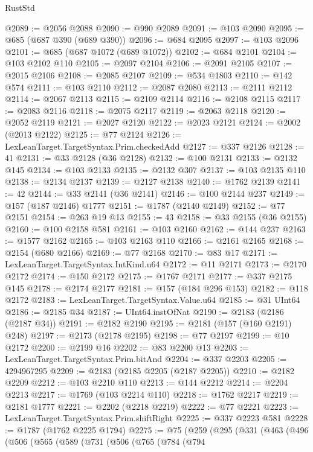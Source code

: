 \begin{lexlean}{RustStd}
\begin{coremodule}
@2089 := @2056 @2088
@2090 := @990 @2089
@2091 := @103 @2090
@2095 := @685 (@687 @390 (@689 @390))
@2096 := @684 @2095
@2097 := @103 @2096
@2101 := @685 (@687 @1072 (@689 @1072))
@2102 := @684 @2101
@2104 := @103 @2102 @110
@2105 := @2097 @2104
@2106 := @2091 @2105
@2107 := @2015 @2106
@2108 := @2085 @2107
@2109 := @534 @1803
@2110 := @142 @574
@2111 := @103 @2110
@2112 := @2087 @2080
@2113 := @2111 @2112
@2114 := @2067 @2113
@2115 := @2109 @2114
@2116 := @2108 @2115
@2117 := @2083 @2116
@2118 := @2075 @2117
@2119 := @2063 @2118
@2120 := @2052 @2119
@2121 := @2027 @2120
@2122 := @2023 @2121
@2124 := @2002 (@2013 @2122)
@2125 := @77 @2124
@2126 := LexLeanTarget.TargetSyntax.Prim.checkedAdd
@2127 := @337 @2126
@2128 := 41
@2131 := @33 @2128 (@36 @2128)
@2132 := @100 @2131
@2133 := @2132 @145
@2134 := @103 @2133
@2135 := @2132 @307
@2137 := @103 @2135 @110
@2138 := @2134 @2137
@2139 := @2127 @2138
@2140 := @1762 @2139
@2141 := 42
@2144 := @33 @2141 (@36 @2141)
@2146 := @100 @2144 @237
@2149 := @157 (@187 @2146) @1777
@2151 := @1787 (@2140 @2149)
@2152 := @77 @2151
@2154 := @263 @19 @13
@2155 := 43
@2158 := @33 @2155 (@36 @2155)
@2160 := @100 @2158 @581
@2161 := @103 @2160
@2162 := @144 @237
@2163 := @1577 @2162
@2165 := @103 @2163 @110
@2166 := @2161 @2165
@2168 := @2154 (@680 @2166)
@2169 := @77 @2168
@2170 := @83 @17
@2171 := LexLeanTarget.TargetSyntax.IntKind.u64
@2172 := @11 @2171
@2173 := @2170 @2172
@2174 := @150 @2172
@2175 := @1767 @2171
@2177 := @337 @2175 @145
@2178 := @2174 @2177
@2181 := @157 (@184 @296 @153)
@2182 := @118 @2172
@2183 := LexLeanTarget.TargetSyntax.Value.u64
@2185 := @31 UInt64
@2186 := @2185 @34
@2187 := UInt64.instOfNat
@2190 := @2183 (@2186 (@2187 @34))
@2191 := @2182 @2190
@2195 := @2181 (@157 (@160 @2191) @248)
@2197 := @2173 (@2178 @2195)
@2198 := @77 @2197
@2199 := @10 @2172
@2200 := @2199 @16
@2202 := @83 @2200 @13
@2203 := LexLeanTarget.TargetSyntax.Prim.bitAnd
@2204 := @337 @2203
@2205 := 4294967295
@2209 := @2183 (@2185 @2205 (@2187 @2205))
@2210 := @2182 @2209
@2212 := @103 @2210 @110
@2213 := @144 @2212
@2214 := @2204 @2213
@2217 := @1769 (@103 @2214 @110)
@2218 := @1762 @2217
@2219 := @2181 @1777
@2221 := @2202 (@2218 @2219)
@2222 := @77 @2221
@2223 := LexLeanTarget.TargetSyntax.Prim.shiftRight
@2225 := @337 @2223 @581
@2228 := @1787 (@1762 @2225 @1794)
@2275 := @75
    (@259
      (@295
        (@331
          (@463
            (@496
              (@506
                (@565
                  (@589
                    (@731
                      (@506
                        (@765
                          (@784
                            (@794

\end{coremodule}
\end{lexlean}
